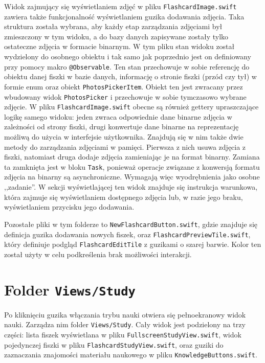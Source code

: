 \documentclass[final,a4paper,openany,12pt]{mwbk}
\begin{document}
Widok zajmujący się wyświetlaniem zdjęć w pliku \texttt{FlashcardImage.swift} zawiera także funkcjonalność wyświetlaniem guzika dodawania zdjęcia. Taka struktura została wybrana, aby każdy etap zarządzania zdjęciami był zmieszczony w tym widoku, a do bazy danych zapisywane zostały tylko ostateczne zdjęcia w formacie binarnym. W tym pliku stan widoku został wydzielony do osobnego obiektu i tak samo jak poprzednio jest on definiowany przy pomocy makro \texttt{@Observable}. Ten stan przechowuje w sobie referencję do obiektu danej fiszki w bazie danych, informację o stronie fiszki (przód czy tył) w formie enum oraz obiekt \texttt{PhotosPickerItem}. Obiekt ten jest zwracany przez wbudowany widok \texttt{PhotosPicker} i przechowuje w sobie tymczasowo wybrane zdjęcie. W pliku \texttt{FlashcardImage.swift} obecne są również gettery upraszczające logikę samego widoku: jeden zwraca odpowiednie dane binarne zdjęcia w zależności od strony fiszki, drugi konwertuje dane binarne na reprezentację możliwą do użycia w interfejsie użytkownika. Znajdują się w nim także dwie metody do zarządzania zdjęciami w pamięci. Pierwsza z nich usuwa zdjęcia z fiszki, natomiast druga dodaje zdjęcia zamieniając je na format binarny. Zamiana ta zamknięta jest w bloku \texttt{Task}, ponieważ operacje związane z konwersją formatu zdjęcia na binarny są asynchroniczne. Wymagają więc wyodrębnienia jako osobne ,,zadanie''. W sekcji wyświetlającej ten widok znajduje się instrukcja warunkowa, która zajmuje się wyświetlaniem dostępnego zdjęcia lub, w razie jego braku, wyświetlaniem przycisku jego dodawania.

Pozostałe pliki w tym folderze to \texttt{NewFlashcardButton.swift}, gdzie znajduje się definicja guzika dodawania nowych fiszek, oraz \texttt{FlashcardPreviewTile.swift}, który definiuje podgląd \texttt{FlashcardEditTile} z guzikami o szarej barwie. Kolor ten został użyty w celu podkreślenia brak możliwości interakcji.

\section{Folder \texttt{Views/Study}}

Po kliknięciu guzika włączania trybu nauki otwiera się pełnoekranowy widok nauki. Zarządza nim folder \texttt{Views/Study}. Cały widok jest podzielony na trzy części: lista fiszek wyświetlana w pliku \texttt{FullscreenStudyView.swift}, widok pojedynczej fiszki w pliku \texttt{FlashcardStudyView.swift}, oraz guziki do zaznaczania znajomości materiału naukowego w pliku \texttt{KnowledgeButtons.swift}.
\end{document}
